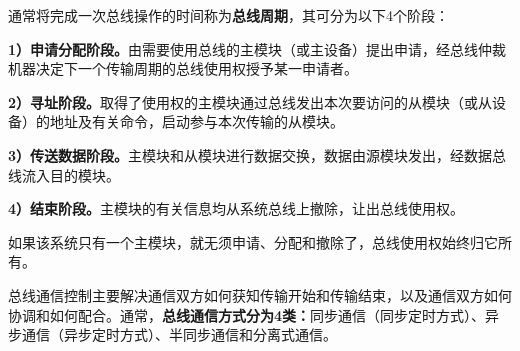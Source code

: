 通常将完成一次总线操作的时间称为{\textbf{总线周期}}，其可分为以下4个阶段：

\textbf{1）申请分配阶段。}由需要使用总线的主模块（或主设备）提出申请，经总线仲裁机器决定下一个传输周期的总线使用权授予某一申请者。

\textbf{2）寻址阶段。}取得了使用权的主模块通过总线发出本次要访问的从模块（或从设备）的地址及有关命令，启动参与本次传输的从模块。

\textbf{3）传送数据阶段。}主模块和从模块进行数据交换，数据由源模块发出，经数据总线流入目的模块。

\textbf{4）结束阶段。}主模块的有关信息均从系统总线上撤除，让出总线使用权。

如果该系统只有一个主模块，就无须申请、分配和撤除了，总线使用权始终归它所有。

总线通信控制主要解决通信双方如何获知传输开始和传输结束，以及通信双方如何协调和如何配合。通常，{\textbf{总线通信方式分为4类：}}同步通信（同步定时方式）、异步通信（异步定时方式）、半同步通信和分离式通信。\\
